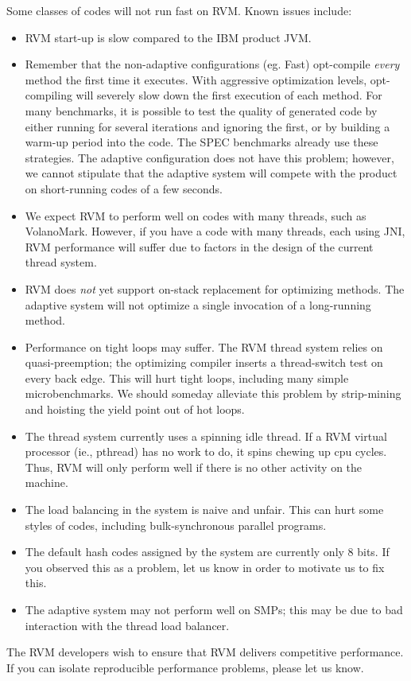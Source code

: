 Some classes of codes will not run fast on RVM.  Known issues include:
\begin{itemize}
\item RVM start-up is slow compared to the IBM product JVM.
\item Remember that the non-adaptive configurations (eg. Fast) opt-compile
{\em every} method the first time it executes.  With aggressive optimization
levels, opt-compiling will severely slow down the first execution of
each method.  For many benchmarks, it is possible to test the quality
of generated code by either running for several iterations and ignoring
the first, or by building a warm-up period into the code.  The SPEC benchmarks
already use these strategies.  The adaptive configuration does not
have this problem; however, we cannot stipulate that the adaptive
system will compete with the product on short-running codes of a few seconds.
\item We expect RVM to perform well on codes with many threads, such as
VolanoMark.  However, if you have a code with many threads, each using
JNI, RVM performance will suffer due to factors in the design of
the current thread system.
\item RVM does {\em not} yet support on-stack replacement for
optimizing methods.  The adaptive system will not optimize a single
invocation of a long-running 
method.
\item Performance on tight loops may suffer.  The RVM thread system
relies on quasi-preemption; the optimizing compiler inserts a thread-switch
test on every back edge.  This will hurt tight loops, including many
simple microbenchmarks.  We should someday alleviate this problem by
strip-mining and hoisting the yield point out of hot loops.
\item The thread system currently uses a spinning idle thread. If a RVM
virtual processor (ie., pthread) has no work to do, it spins chewing up
cpu cycles.  Thus, RVM will only perform well if there is no other activity on the machine.
\item The load balancing in the system is naive and unfair.  This can hurt some styles of codes, including bulk-synchronous parallel programs.
\item The default hash codes assigned by the system are currently only 8
bits.  If you observed this as a problem, let us know in order to motivate
us to fix this.
\item The adaptive system may not perform well on SMPs; this may be due to bad
interaction with the thread load balancer.
\end{itemize}

The RVM developers wish to ensure that RVM delivers competitive performance.
If you can isolate reproducible performance problems, please let us
know. 

